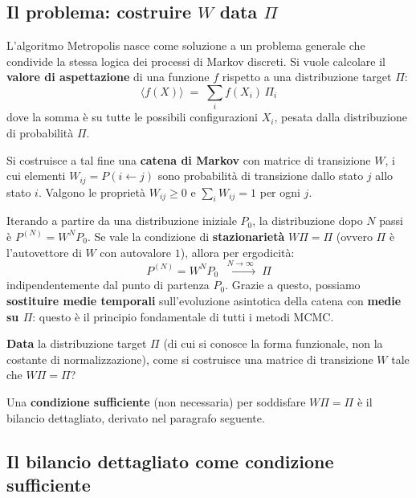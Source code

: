 \documentclass[12pt,a4paper]{article}
\begin{document}
\subsection{Il problema: costruire $W$ data $\Pi$}

L'algoritmo Metropolis nasce come soluzione a un problema generale che condivide
la stessa logica dei processi di Markov discreti. Si vuole calcolare il
\textbf{valore di aspettazione} di una funzione $f$ rispetto a una distribuzione
target $\Pi$:
\begin{equation}
  \langle f(X) \rangle \;=\; \sum_i f(X_i)\,\Pi_i
  \label{eq:aspettazione_mc}
\end{equation}
dove la somma è su tutte le possibili configurazioni $X_i$, pesata dalla
distribuzione di probabilità $\Pi$.

Si costruisce a tal fine una \textbf{catena di Markov} con matrice di transizione $W$,
i cui elementi $W_{ij} = P(i \leftarrow j)$ sono probabilità di transizione dallo
stato $j$ allo stato $i$. Valgono le proprietà $W_{ij} \ge 0$ e
$\sum_i W_{ij} = 1$ per ogni $j$.

Iterando a partire da una distribuzione iniziale $P_0$, la distribuzione dopo $N$ passi è
$P^{(N)} = W^N P_0$. Se vale la condizione di \textbf{stazionarietà} $W\Pi = \Pi$
(ovvero $\Pi$ è l'autovettore di $W$ con autovalore $1$), allora per ergodicità:
\begin{equation}
  P^{(N)} = W^N P_0 \;\xrightarrow{\;N \to \infty\;}\; \Pi
\end{equation}
indipendentemente dal punto di partenza $P_0$. Grazie a questo, possiamo
\textbf{sostituire medie temporali} sull'evoluzione asintotica della catena con
\textbf{medie su $\Pi$}: questo è il principio fondamentale di tutti i metodi MCMC.

\begin{osservazione}[title=Problema fondamentale di MCMC]
\textbf{Data} la distribuzione target $\Pi$ (di cui si conosce la forma funzionale,
non la costante di normalizzazione), come si costruisce una matrice di transizione
$W$ tale che $W\Pi = \Pi$?
\end{osservazione}

Una \textbf{condizione sufficiente} (non necessaria) per soddisfare $W\Pi = \Pi$
è il bilancio dettagliato, derivato nel paragrafo seguente.

\subsection{Il bilancio dettagliato come condizione sufficiente}
\end{document}
